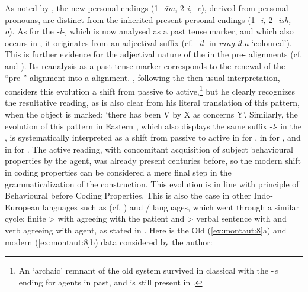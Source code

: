 \documentclass[output=paper]{langsci/langscibook}
\begin{document}
As noted by \citet{Chatterji1926}, the new  personal endings (1 -\textit{ām}, 2-\textit{i}, -\textit{e}), derived from personal pronouns, are distinct from the inherited present  personal endings (1 -\textit{i,} 2\textit{ -ish, -o}). As for the \textit{{}-l-,} which is now analysed as a past tense marker, and which also occurs in , it originates from an adjectival suffix (cf.  -\textit{il}{}- in \textit{rang.il.ā} ‘coloured’). This  is further evidence for the adjectival nature of the  in the pre- alignments (cf. \citealt[928]{Chatterji1926} and \citealt{Tessitori19141916}). Its reanalysis as a past tense marker corresponds to the renewal of the “pre-” alignment into a  alignment. \citet{Chatterji1926}, following the then-usual interpretation, considers this evolution a shift from passive to active,\footnote{An ‘archaic’ remnant of the old system survived in classical  with the -\textit{e} ending for agents in  past, and is still present in .} but he clearly recognizes the resultative reading, as is also clear from his literal translation of this pattern, when the object is marked: ‘there has been V by X as concerns Y’.
Similarly, the evolution of this pattern in Eastern , which also displays the same suffix -\textit{l}{}- in the , is systematically interpreted as a shift from passive to active in \citet[247 ff]{Saxena1937} for , in \citet[492 ff]{Jha1985[1958]} for , and in \citet[171]{Tiwari1966} for . The active reading, with concomitant acquisition of subject behavioural properties by the agent, was already present centuries before, so the modern shift in coding properties can be considered a mere final step in the grammaticalization of the construction. This evolution is in line with  principle of Behavioural before Coding Properties.
  This is also the case in other Indo-European languages such as  (cf. \citealt{Cardona1970}) and / languages, which went through a similar cycle: finite  >  with   agreeing with the patient and  > verbal sentence with  and verb agreeing with agent, as stated in \citet{Kuryłowicz1931,Kuryłowicz1965}. Here is the Old (\ref{ex:montaut:8}a) and modern (\ref{ex:montaut:8}b)  data considered by the author:
   
\end{document}
